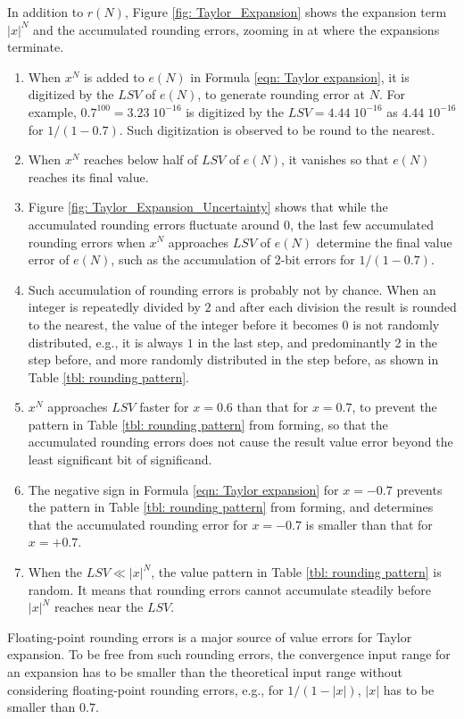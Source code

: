 \documentclass[twoside]{article}
\numberwithin{equation}{section}
\begin{document}
In addition to $r(N)$, Figure \ref{fig: Taylor_Expansion} shows the expansion term $|x|^N$ and the accumulated rounding errors, zooming in at where the expansions terminate.
\begin{enumerate}
\item When $x^N$ is added to $e(N)$ in Formula \eqref{eqn: Taylor expansion}, it is digitized by the $LSV$ of $e(N)$, to generate rounding error at $N$.
For example, $0.7^{100}=3.23\; 10^{-16}$ is digitized by the $LSV=4.44\; 10^{-16}$ as $4.44\; 10^{-16}$ for $1/(1 - 0.7)$.
Such digitization is observed to be round to the nearest.

\item When $x^N$ reaches below half of $LSV$ of $e(N)$, it vanishes so that $e(N)$ reaches its final value.

\item Figure \ref{fig: Taylor_Expansion_Uncertainty} shows that while the accumulated rounding errors fluctuate around $0$, the last few accumulated rounding errors when $x^N$ approaches $LSV$ of $e(N)$ determine the final value error of $e(N)$, such as the accumulation of 2-bit errors for $1/(1 - 0.7)$.

\item Such accumulation of rounding errors is probably not by chance.
When an integer is repeatedly divided by $2$ and after each division the result is rounded to the nearest, the value of the integer before it becomes $0$ is not randomly distributed, e.g., it is always $1$ in the last step, and predominantly 2 in the step before, and more randomly distributed in the step before, as shown in Table \ref{tbl: rounding pattern}.

\item $x^N$ approaches $LSV$ faster for $x = 0.6$ than that for $x = 0.7$, to prevent the pattern in Table \ref{tbl: rounding pattern} from forming, so that the accumulated rounding errors does not cause the result value error beyond the least significant bit of significand.

\item The negative sign in Formula \eqref{eqn: Taylor expansion} for $x =-0.7$ prevents the pattern in Table \ref{tbl: rounding pattern} from forming, and determines that the accumulated rounding error for $x =-0.7$ is smaller than that for $x = +0.7$.

\item When the $LSV \ll |x|^N$, the value pattern in Table \ref{tbl: rounding pattern} is random.
It means that rounding errors cannot accumulate steadily before $|x|^N$ reaches near the $LSV$.

\end{enumerate}
Floating-point rounding errors is a major source of value errors for Taylor expansion.
To be free from such rounding errors, the convergence input range for an expansion has to be smaller than the theoretical input range without considering  floating-point rounding errors, e.g., for $1/(1 -|x|)$, $|x|$ has to be smaller than $0.7$.
\end{document}
